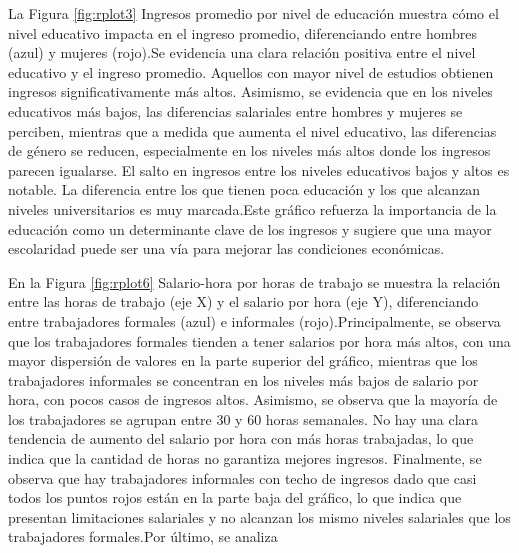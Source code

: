 \documentclass[12pt,a4paper,onecolumn]{article}
\begin{document}
\begin{enumerate}
\begin{enumerate}
La Figura \ref{fig:rplot3} Ingresos promedio por nivel de educaci\'on muestra c\'omo el nivel educativo impacta en el ingreso promedio, diferenciando entre hombres (azul) y mujeres (rojo).Se evidencia una clara relaci\'on positiva entre el nivel educativo y el ingreso promedio. Aquellos con mayor nivel de estudios obtienen ingresos significativamente m\'as altos. Asimismo, se evidencia que en los niveles educativos m\'as bajos, las diferencias salariales entre hombres y mujeres se perciben, mientras que a medida que aumenta el nivel educativo, las diferencias de g\'enero se reducen, especialmente en los niveles m\'as altos donde los ingresos parecen igualarse. El salto en ingresos entre los niveles educativos bajos y altos es notable. La diferencia entre los que tienen poca educaci\'on y los que alcanzan niveles universitarios es muy marcada.Este gr\'afico refuerza la importancia de la educaci\'on como un determinante clave de los ingresos y sugiere que una mayor escolaridad puede ser una vía para mejorar las condiciones econ\'omicas.

En la Figura \ref{fig:rplot6} Salario-hora por horas de trabajo se muestra la relaci\'on entre las horas de trabajo (eje X) y el salario por hora (eje Y), diferenciando entre trabajadores formales (azul) e informales (rojo).Principalmente, se observa que los trabajadores formales tienden a tener salarios por hora m\'as altos, con una mayor dispersi\'on de valores en la parte superior del gr\'afico, mientras que los trabajadores informales se concentran en los niveles m\'as bajos de salario por hora, con pocos casos de ingresos altos. Asimismo, se observa que la mayor\'ia de los trabajadores se agrupan entre 30 y 60 horas semanales. No hay una clara tendencia de aumento del salario por hora con m\'as horas trabajadas, lo que indica que la cantidad de horas no garantiza mejores ingresos. Finalmente, se observa que hay trabajadores informales con techo de ingresos dado que casi todos los puntos rojos est\'an en la parte baja del gr\'afico, lo que indica que presentan limitaciones salariales y no alcanzan los mismo niveles salariales que los trabajadores formales.Por \'ultimo, se analiza 


\end{enumerate}
\end{enumerate}
\end{document}
